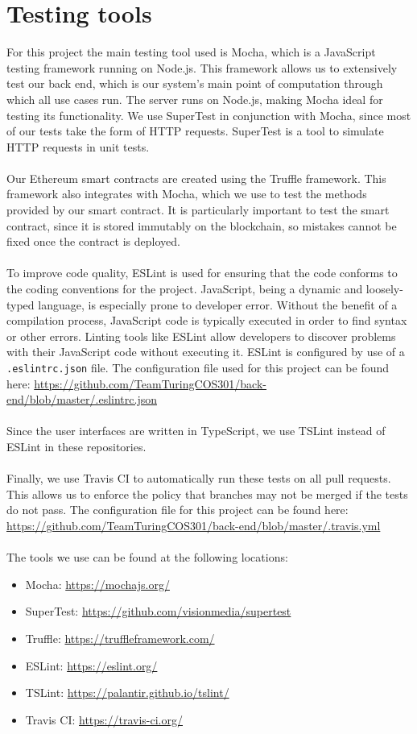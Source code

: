 \documentclass{article}
\begin{document}
\section{Testing tools}
For this project the main testing tool used is Mocha, which is a JavaScript testing framework running on Node.js. This framework allows us to extensively test our back end, which is our system's main point of computation through which all use cases run. The server runs on Node.js, making Mocha ideal for testing its functionality. We use SuperTest in conjunction with Mocha, since most of our tests take the form of HTTP requests. SuperTest is a tool to simulate HTTP requests in unit tests.
\\\\
Our Ethereum smart contracts are created using the Truffle framework. This framework also integrates with Mocha, which we use to test the methods provided by our smart contract. It is particularly important to test the smart contract, since it is stored immutably on the blockchain, so mistakes cannot be fixed once the contract is deployed.
\\\\
To improve code quality, ESLint is used for ensuring that the code conforms to the coding conventions for the project. JavaScript, being a dynamic and loosely-typed language, is especially prone to developer error. Without the benefit of a compilation process, JavaScript code is typically executed in order to find syntax or other errors. Linting tools like ESLint allow developers to discover problems with their JavaScript code without executing it. ESLint is configured by use of a \texttt{.eslintrc.json} file. The configuration file used for this project can be found here: \url{https://github.com/TeamTuringCOS301/back-end/blob/master/.eslintrc.json}
\\\\
Since the user interfaces are written in TypeScript, we use TSLint instead of ESLint in these repositories.
\\\\
Finally, we use Travis CI to automatically run these tests on all pull requests. This allows us to enforce the policy that branches may not be merged if the tests do not pass. The configuration file for this project can be found here:\\
\url{https://github.com/TeamTuringCOS301/back-end/blob/master/.travis.yml}
\\\\
The tools we use can be found at the following locations:
\begin{itemize}
\item Mocha: \url{https://mochajs.org/}
\item SuperTest: \url{https://github.com/visionmedia/supertest}
\item Truffle: \url{https://truffleframework.com/}
\item ESLint: \url{https://eslint.org/}
\item TSLint: \url{https://palantir.github.io/tslint/}
\item Travis CI: \url{https://travis-ci.org/}
\end{itemize}
\end{document}
